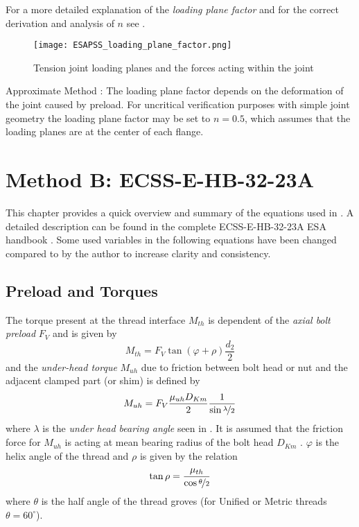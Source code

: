 For a more detailed explanation of the \emph{loading plane factor} and for the correct derivation
and analysis of $n$ see \cite{VDI2230_1,ECSS_HB_32_23A}.
\begin{figure}[!htpb]
  \centering
  \texttt{[image: ESAPSS\_loading\_plane\_factor.png]}
  \caption{Tension joint loading planes and the forces acting within the joint \cite{ESAPSS}}
  \label{fig:esapss_lpf_1}
\end{figure}
\begin{colbox}{Approximate Method \cite{ECSS_HB_32_23A}:}
  The loading plane factor depends on the deformation of the joint caused by preload. For uncritical
  verification purposes with simple joint geometry the loading plane factor may be set to $n=0.5$,
  which assumes that the loading planes are at the center of each flange.
\end{colbox}

\chapter{Method B: ECSS-E-HB-32-23A}
This chapter provides a quick overview and summary of the equations used in \bat. A detailed description
can be found in the complete ECSS-E-HB-32-23A ESA handbook \cite{ECSS_HB_32_23A}. Some used variables
in the following equations have been changed compared to \cite{ECSS_HB_32_23A} by the author to increase
clarity and consistency.

\section{Preload and Torques}
\label{sec:preload}
The torque present at the thread interface $M_{th}$ is dependent of the \emph{axial bolt preload} $F_V$ 
and is given by
\begin{equation}
  M_{th} = F_V \tan(\varphi+\rho)\frac{d_2}{2}
\end{equation}
and the \emph{under-head torque} $M_{uh}$ due to friction between bolt head or nut and the adjacent 
clamped part (or shim) is defined by
\begin{equation}
  M_{uh} = F_V \frac{\mu_{uh} D_{Km}}{2} \frac{1}{\sin{\nicefrac{\lambda}{2}}}
  \label{equ:Muh}
\end{equation}
where $\lambda$ is the \emph{under head bearing angle} seen in .
It is assumed that the friction force for $M_{uh}$ is acting at mean bearing radius of the bolt head 
$D_{Km}$ . $\varphi$ is the helix angle of the thread and $\rho$ is given by the relation
\begin{equation}
  \tan\rho = \frac{\mu_{th}}{\cos\nicefrac{\theta}{2}}
\end{equation}
where $\theta$ is the half angle of the thread groves (for Unified or Metric threads $\theta=60^\circ$).


